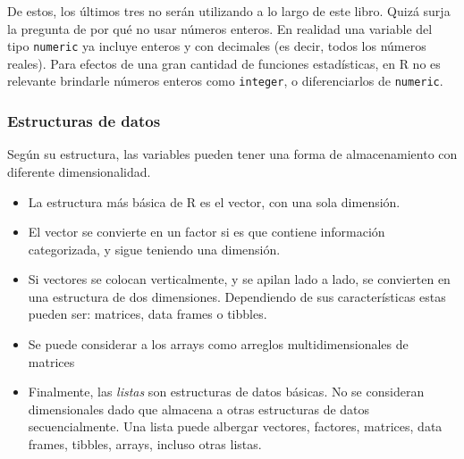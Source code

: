 \documentclass[
]{article}
\providecommand{\tightlist}{%
  \setlength{\itemsep}{0pt}\setlength{\parskip}{0pt}}
\theoremstyle{definition}
\theoremstyle{definition}
\theoremstyle{definition}
\theoremstyle{definition}
\theoremstyle{remark}
\begin{document}
De estos, los últimos tres no serán utilizando a lo largo de este libro. Quizá surja la pregunta de por qué no usar números enteros. En realidad una variable del tipo \texttt{numeric} ya incluye enteros y con decimales (es decir, todos los números reales). Para efectos de una gran cantidad de funciones estadísticas, en R no es relevante brindarle números enteros como \texttt{integer}, o diferenciarlos de \texttt{numeric}.

\hypertarget{estructuras-de-datos}{%
\subsubsection{Estructuras de datos}\label{estructuras-de-datos}}

Según su estructura, las variables pueden tener una forma de almacenamiento con diferente dimensionalidad.

\begin{itemize}
\tightlist
\item
  La estructura más básica de R es el vector, con una sola dimensión.
\item
  El vector se convierte en un factor si es que contiene información categorizada, y sigue teniendo una dimensión.
\item
  Si vectores se colocan verticalmente, y se apilan lado a lado, se convierten en una estructura de dos dimensiones. Dependiendo de sus características estas pueden ser:
  matrices, data frames o tibbles.
\item
  Se puede considerar a los arrays como arreglos multidimensionales de matrices
\item
  Finalmente, las \emph{listas} son estructuras de datos básicas. No se consideran dimensionales dado que almacena a otras estructuras de datos secuencialmente. Una lista puede albergar vectores, factores, matrices, data frames, tibbles, arrays, incluso otras listas.
\end{itemize}
\end{document}
